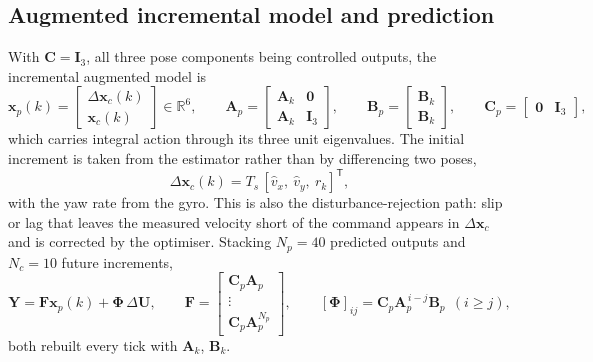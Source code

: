 \documentclass[11pt,a4paper]{article}
\newcommand{\vect}[1]{\bm{#1}}
\newcommand{\mat}[1]{\bm{#1}}
\newcommand{\T}{^{\mathsf{T}}}
\newcommand{\Real}{\mathbb{R}}
\newcommand{\dU}{\Delta\vect{U}}
\newcommand{\Ts}{T_s}
\newcommand{\Np}{N_p}
\newcommand{\Nc}{N_c}
\begin{document}
\subsection{Augmented incremental model and prediction}
With $\mat C = \mat I_3$, all three pose components being controlled outputs, the incremental augmented model is
\begin{equation}
\vect x_p(k) = \begin{bmatrix}\Delta\vect x_c(k)\\ \vect x_c(k)\end{bmatrix}\in\Real^6,\qquad
\mat A_p = \begin{bmatrix}\mat A_k & \mat 0\\ \mat A_k & \mat I_3\end{bmatrix},\qquad
\mat B_p = \begin{bmatrix}\mat B_k\\ \mat B_k\end{bmatrix},\qquad
\mat C_p = \begin{bmatrix}\mat 0 & \mat I_3\end{bmatrix},
\label{eq:mpc-aug}
\end{equation}
which carries integral action through its three unit eigenvalues. The initial increment is taken from the estimator rather than by differencing two poses,
\begin{equation}
\Delta\vect x_c(k) = \Ts\,[\hat v_x,\ \hat v_y,\ r_k]\T,
\label{eq:mpc-dx}
\end{equation}
with the yaw rate from the gyro. This is also the disturbance-rejection path: slip or lag that leaves the measured velocity short of the command appears in $\Delta\vect x_c$ and is corrected by the optimiser. Stacking $\Np = 40$ predicted outputs and $\Nc = 10$ future increments,
\begin{equation}
\vect Y = \mat F\vect x_p(k) + \mat\Phi\,\dU,\qquad
\mat F = \begin{bmatrix}\mat C_p\mat A_p\\ \vdots\\ \mat C_p\mat A_p^{\Np}\end{bmatrix},\qquad
[\mat\Phi]_{ij} = \mat C_p\mat A_p^{\,i-j}\mat B_p\ \ (i\ge j),
\label{eq:mpc-pred}
\end{equation}
both rebuilt every tick with $\mat A_k$, $\mat B_k$.
\end{document}
